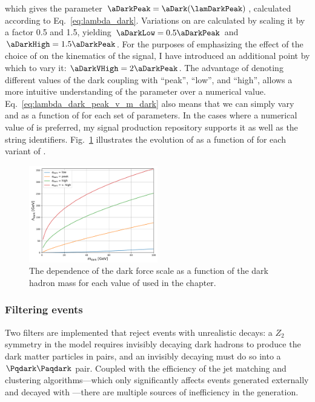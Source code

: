 which gives the parameter $\aDarkPeak = \aDark(\lamDarkPeak)$, calculated according to Eq.~\ref{eq:lambda_dark}. Variations on \aDark are calculated by scaling it by a factor 0.5 and 1.5, yielding $\aDarkLow = 0.5\aDarkPeak$ and $\aDarkHigh = 1.5\aDarkPeak$. For the purposes of emphasizing the effect of the choice of \aDark on the kinematics of the signal, I have introduced an additional point by which to vary it: $\aDarkVHigh = 2\aDarkPeak$. The advantage of denoting different values of the dark coupling with ``peak'', ``low'', and ``high'', allows a more intuitive understanding of the parameter over a numerical value. Eq.~\ref{eq:lambda_dark_peak_v_m_dark} also means that we can simply vary \lamDark and \aDark as a function of \mDark for each set of parameters. In the cases where a numerical value of \aDark is preferred, my signal production repository supports it as well as the string identifiers. Fig.~\ref{fig:svj_lamDark_vs_mDark} illustrates the evolution of \lamDark as a function of \mDark for each variant of \aDark.

\begin{figure}[htbp]
    \centering
    \includegraphics[width=0.5\textwidth]{figures/lambda_dark_vs_mDark_with_vHigh.pdf}
    \caption[The dependence of the dark force scale \lamDark as a function of the dark hadron mass \mDark for each value of \aDark used in the chapter]{The dependence of the dark force scale \lamDark as a function of the dark hadron mass \mDark for each value of \aDark used in the chapter.}
    \label{fig:svj_lamDark_vs_mDark}
\end{figure}




\subsubsection{Filtering events}
\label{subsubsec:svj_pythia_filters}

Two filters are implemented that reject events with unrealistic decays: a $Z_2$ symmetry in the model requires invisibly decaying dark hadrons to produce the dark matter particles in pairs, and an invisibly decaying \PZprime must do so into a $\Pqdark\Paqdark$ pair. Coupled with the efficiency of the \gls{jet} matching and clustering algorithms---which only significantly affects events generated externally and decayed with \PYTHIA---there are multiple sources of inefficiency in the generation.


